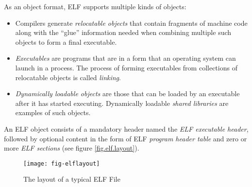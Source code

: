 \documentclass[a4paper,pdftex]{book}
\newcommand{\firstterm}[1]{\textit{#1}}
\begin{document}
As an object format, ELF supports multiple kinds of objects:

\begin{itemize}
\item Compilers generate \firstterm{relocatable
  objects} that contain fragments of
  machine code along with the ``glue'' information needed when
  combining multiple such objects to form a final executable.
\item \firstterm{Executables} are programs that are
  in a form that an operating system can launch in a process.  The
  process of forming executables from collections of relocatable
  objects is called \firstterm{linking}.
\item \firstterm{Dynamically loadable objects} are those that can be loaded by an executable
  after it has started executing.  Dynamically loadable
  \firstterm{shared libraries} are examples of
  such objects.
\end{itemize}

An ELF object consists of a mandatory header named the \firstterm{ELF
  executable header}, followed by optional
content in the form of ELF \firstterm{program header table}
 and zero or more \firstterm{ELF
  sections} (see figure \vref{fig.elf.layout}).

\begin{figure}
  \caption{The layout of a typical ELF File}\label{fig.elf.layout}
  \begin{center}
    \texttt{[image: fig-elflayout]}
  \end{center}
\end{figure}
\end{document}
